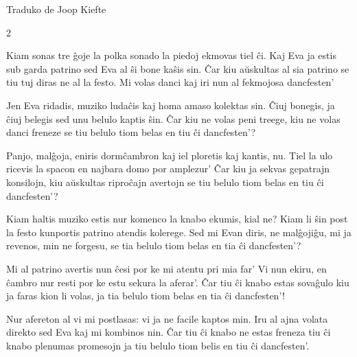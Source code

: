 {\color{gray}Traduko de Joop Kiefte}

\medskip

\begin{paracol}{2}
\begin{guitar}
  Kiam sonas tre ĝoje la polka sonado
  la piedoj ekmovas tiel ĉi.
  Kaj Eva ja estis sub garda patrino
  sed Eva al ŝi bone kaŝis sin.
  Ĉar kiu aŭskultas al sia patrino
  se tiu tuj diras ne al la festo.
  Mi volas danci kaj iri nun
  al fekmojosa dancfesten'

  Jen Eva ridadis, muziko ludaĉis
  kaj homa amaso kolektas sin.
  Ĉiuj bonegis, ja ĉiuj belegis
  sed unu belulo kaptis ŝin.
  Ĉar kiu ne volas peni treege,
  kiu ne volas danci freneze
  se tiu belulo tiom belas
  en tiu ĉi dancfesten'?

  Panjo, malĝoja, eniris dormĉambron
  kaj iel ploretis kaj kantis, nu.
  Tiel la ulo ricevis la spacon
  en najbara domo por amplezur'
  Ĉar kiu ja sekvas gepatrajn konsilojn,
  kiu aŭskultas riproĉajn avertojn
  se tiu belulo tiom belas
  en tiu ĉi dancfesten'?
\end{guitar}

\switchcolumn

\begin{guitar}
  Kiam haltis muziko estis nur komenco
  la knabo ekumis, kial ne?
  Kiam li ŝin post la festo kunportis
  patrino atendis kolerege.
  Sed mi Evan diris, ne malĝojiĝu,
  mi ja revenos, min ne forgesu,
  se tia belulo tiom belas
  en tia ĉi dancfesten'?

  Mi al patrino avertis nun ĉesi
  por ke mi atentu pri mia far'
  Vi nun ekiru, en ĉambro nur resti
  por ke estu sekura la aferar'.
  Ĉar tiu ĉi knabo estas sovaĝulo
  kiu ja faras kion li volas,
  ja tia belulo tiom belas
  en tia ĉi dancfesten'!

  Nur afereton al vi mi postlasas:
  vi ja ne facile kaptos min.
  Iru al ajna volata direkto
  sed Eva kaj mi kombinos nin.
  Ĉar tiu ĉi knabo ne estas freneza
  tiu ĉi knabo plenumas promesojn
  ja tiu belulo tiom belis
  en tiu ĉi dancfesten'.
\end{guitar}
\end{paracol}
